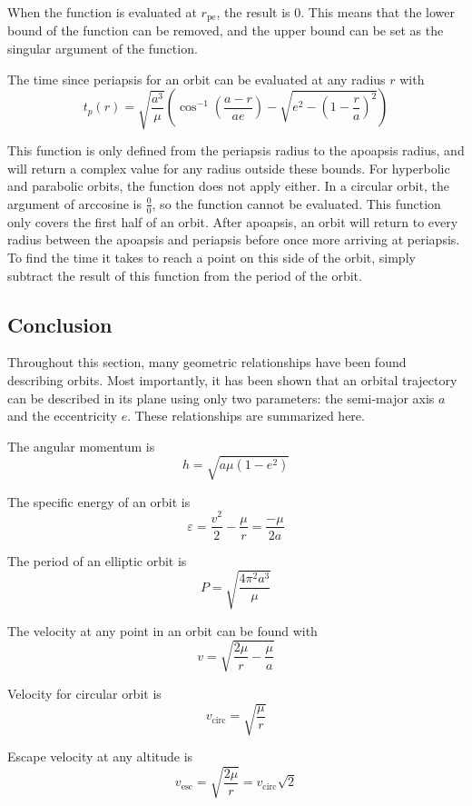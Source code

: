 \documentclass{article}
\begin{document}
When the function is evaluated at $r_\text{pe}$, the result is $0$. This means that the lower bound of the function can be removed, and the upper bound can be set as the singular argument of the function.

The time since periapsis for an orbit can be evaluated at any radius $r$ with
\begin{equation}\label{Time since periapsis}
    t_p(r)=\sqrt{\frac{a^3}{\mu}}\left(\cos^{-1}\left(\frac{a-r}{ae}\right)- \sqrt{e^2-\left(1-\frac{r}{a}\right)^2}\right)
\end{equation}

This function is only defined from the periapsis radius to the apoapsis radius, and will return a complex value for any radius outside these bounds. For hyperbolic and parabolic orbits, the function does not apply either. In a circular orbit, the argument of arccosine is $\frac{0}{0}$, so the function cannot be evaluated. This function only covers the first half of an orbit. After apoapsis, an orbit will return to every radius between the apoapsis and periapsis before once more arriving at periapsis. To find the time it takes to reach a point on this side of the orbit, simply subtract the result of this function from the period of the orbit.

\bigskip\bigskip
\subsection{Conclusion}

Throughout this section, many geometric relationships have been found describing orbits. Most importantly, it has been shown that an orbital trajectory can be described in its plane using only two parameters: the semi-major axis $a$ and the eccentricity $e$. These relationships are summarized here.

\bigskip
The angular momentum is
$$h=\sqrt{a\mu(1-e^2)}$$

\bigskip
The specific energy of an orbit is
$$\varepsilon=\frac{v^2}{2}-\frac{\mu}{r}=\frac{-\mu}{2a}$$

\bigskip
The period of an elliptic orbit is
$$P=\sqrt{\frac{4\pi^2a^3}{\mu}}$$

\bigskip
The velocity at any point in an orbit can be found with
$$v=\sqrt{\frac{2\mu}{r}-\frac{\mu}{a}}$$

Velocity for circular orbit is
$$v_\text{circ}=\sqrt{\frac{\mu}{r}}$$

Escape velocity at any altitude is
$$v_\text{esc}=\sqrt{\frac{2\mu}{r}}=v_\text{circ}\sqrt{2}$$
\end{document}
